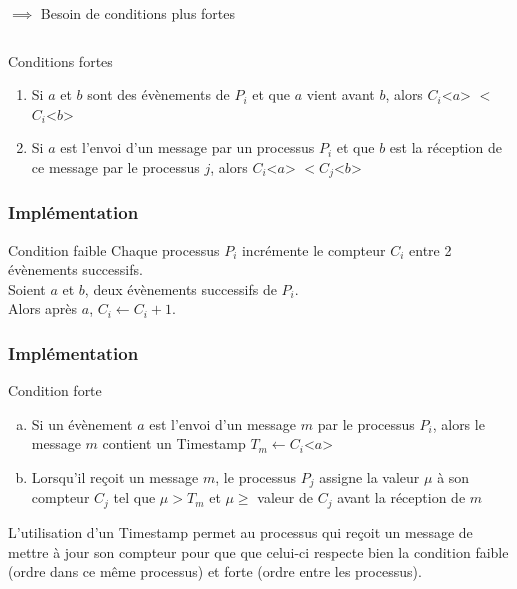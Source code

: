\documentclass[compress]{beamer}
\begin{document}
\begin{frame}
\begin{columns}
\begin{column}{0.65 \textwidth}
$\implies$ Besoin de conditions plus fortes
	\end{column}
	\end{columns}
\begin{block}{Conditions fortes}
\begin{enumerate}
\item Si $a$ et $b$ sont des évènements de $P_i$ et que $a$ vient avant $b$, alors $C_i$<$a$> $<$ $C_i$<$b$>
\item Si $a$ est l'envoi d'un message par un processus $P_i$ et que $b$ est la réception de ce message par le processus $j$, alors $C_i$<$a$> $< C_j$<$b$>
\end{enumerate}
\end{block}
\end{frame}



\begin{frame}
\frametitle{Implémentation}
\begin{block}{Condition faible}
Chaque processus $P_i$ incrémente le compteur $C_i$ entre 2 évènements successifs.\\
Soient $a$ et $b$, deux évènements successifs de $P_i$. \\
Alors après $a$, $C_i \leftarrow C_i + 1$.
\end{block}
\end{frame}

\begin{frame}
	\frametitle{Implémentation}
	\begin{block}{Condition forte}
	\begin{enumerate}[(a)]
		\item Si un évènement $a$ est l'envoi d'un message $m$ par le processus $P_i$, alors le message $m$ contient un Timestamp $T_m \leftarrow C_i$<$a$>
		\item Lorsqu'il reçoit un message $m$, le processus $P_j$ assigne la valeur $\mu$ à son compteur $C_j$ tel que $\mu > T_m$ et $\mu \geq$ valeur de $C_j$ avant la réception de $m$
	\end{enumerate}
	\end{block}
	\bigskip
	L'utilisation d'un Timestamp permet au processus qui reçoit un message de mettre à jour son compteur pour que que celui-ci respecte bien la condition faible (ordre dans ce même processus) et forte (ordre entre les processus).
\end{frame}
\end{document}
